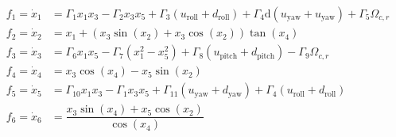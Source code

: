 \documentclass[3p]{elsarticle}
\begin{document}
\begin{align}
    f_1 = \dot{x}_1 &= \Gamma_1 x_1 x_3 - \Gamma_2 x_3 x_5 + \Gamma_3  (u_{\text{roll}} + d_{\text{roll}})
 + \Gamma_4 \mathrm{d} (u_{\text{yaw}} + u_{\text{yaw}}) 
+ \Gamma_5 \Omega_{c, r}  \label{eq:eq_of_motion_start1} \\
    f_2 = \dot{x}_2 &= x_1 + (x_3\sin(x_2) + x_3\cos(x_2))\tan(x_4)  \\
    f_3 = \dot{x}_3 &= \Gamma_6 x_1 x_5 - \Gamma_7 (x_1^2 - x_5^2) + \Gamma_8  (u_{\text{pitch}} + d_{\text{pitch}})- \Gamma_9 \Omega_{c, r} \\
    f_4 = \dot{x}_4 &= x_3\cos(x_4) - x_5\sin(x_2) \\
    f_5 = \dot{x}_5 &= \Gamma_{10} x_1 x_3 - \Gamma_{1} x_3 x_5 + \Gamma_{11} (u_{\text{yaw}} + d_{\text{yaw}}) + \Gamma_{4}(u_{\text{roll}} + d_{\text{roll}})\\
    f_6 = \dot{x}_6 &= \dfrac{x_3\sin(x_4) + x_5\cos(x_2)}{\cos(x_4)}~\label{eq:eq_of_motion_end1}
\end{align}


    
\end{document}
